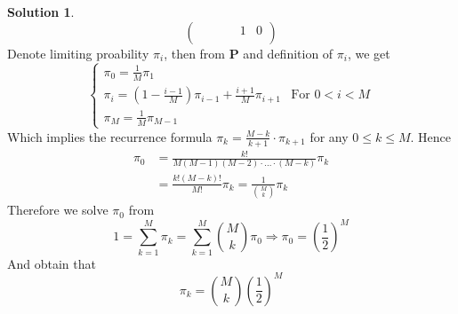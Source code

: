 \documentclass[a4paper, 10pt]{article}
\theoremstyle{definition}
\theoremstyle{hSol}
\newtheorem*{solution}{Solution}
\begin{document}
\begin{solution}
\begin{equation}
\begin{pmatrix}
    & & &  & 1 & 0 \\[5pt]
  \end{pmatrix}
\end{equation}
Denote limiting proability $\pi_i$, then from $\bm{P}$ and definition of $\pi_i$, we get
\begin{equation}
  \begin{cases}
  \pi_0 = \frac{1}{M} \pi_1 & \\
  \pi_i = \left(1-\frac{i-1}{M}\right)\pi_{i-1} + \frac{i+1}{M} \pi_{i+1} & \text{For $0<i<M$} \\
  \pi_M = \frac{1}{M} \pi_{M-1}
  \end{cases}
\end{equation}
Which implies the recurrence formula $\pi_k = \frac{M-k}{k+1}\cdot\pi_{k+1}$ for any $0\leq k\leq M$. Hence
\begin{equation}
  \begin{split}
    \pi_0 &= \frac{k!}{M(M-1)(M-2)\cdot...\cdot(M-k)}\pi_k \\
    &= \frac{k!(M-k)!}{M!}\pi_k = \frac{1}{\binom{M}{k}} \pi_k 
  \end{split}
\end{equation}
Therefore we solve $\pi_0$ from
\begin{equation}
  1 = \sum_{k=1}^M \pi_k = \sum_{k=1}^M \binom{M}{k} \pi_0 \Rightarrow \pi_0 = \left(\frac{1}{2}\right)^M
\end{equation}
And obtain that
\begin{equation}
  \pi_k = \binom{M}{k}\left(\frac{1}{2}\right)^M
\end{equation}
\end{solution}
\end{document}
